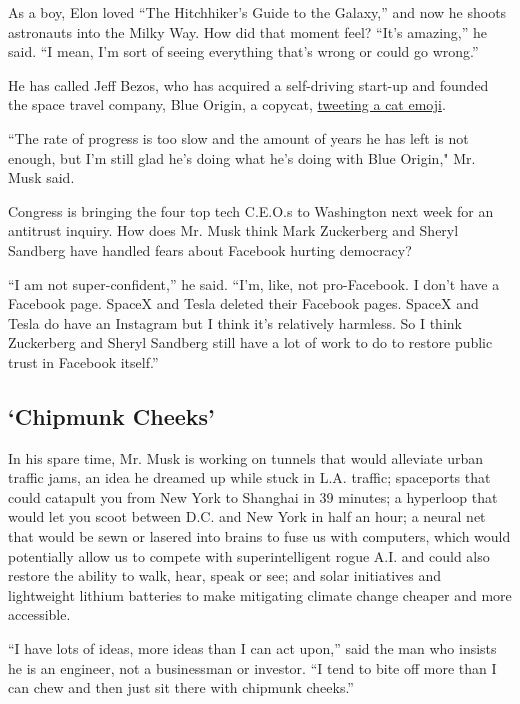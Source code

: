 As a boy, Elon loved ``The Hitchhiker's Guide to the Galaxy,'' and now
he shoots astronauts into the Milky Way. How did that moment feel?
``It's amazing,'' he said. ``I mean, I'm sort of seeing everything
that's wrong or could go wrong.''

He has called Jeff Bezos, who has acquired a self-driving start-up and
founded the space travel company, Blue Origin, a copycat,
\href{https://twitter.com/elonmusk/status/1115764921482919937}{tweeting
a cat emoji}.

``The rate of progress is too slow and the amount of years he has left
is not enough, but I'm still glad he's doing what he's doing with Blue
Origin," Mr. Musk said.

Congress is bringing the four top tech C.E.O.s to Washington next week
for an antitrust inquiry. How does Mr. Musk think Mark Zuckerberg and
Sheryl Sandberg have handled fears about Facebook hurting democracy?

``I am not super-confident,'' he said. ``I'm, like, not pro-Facebook. I
don't have a Facebook page. SpaceX and Tesla deleted their Facebook
pages. SpaceX and Tesla do have an Instagram but I think it's relatively
harmless. So I think Zuckerberg and Sheryl Sandberg still have a lot of
work to do to restore public trust in Facebook itself.''

\hypertarget{chipmunk-cheeks}{%
\subsection{`Chipmunk Cheeks'}\label{chipmunk-cheeks}}

In his spare time, Mr. Musk is working on tunnels that would alleviate
urban traffic jams, an idea he dreamed up while stuck in L.A. traffic;
spaceports that could catapult you from New York to Shanghai in 39
minutes; a hyperloop that would let you scoot between D.C. and New York
in half an hour; a neural net that would be sewn or lasered into brains
to fuse us with computers, which would potentially allow us to compete
with superintelligent rogue A.I. and could also restore the ability to
walk, hear, speak or see; and solar initiatives and lightweight lithium
batteries to make mitigating climate change cheaper and more accessible.

``I have lots of ideas, more ideas than I can act upon,'' said the man
who insists he is an engineer, not a businessman or investor. ``I tend
to bite off more than I can chew and then just sit there with chipmunk
cheeks.''

